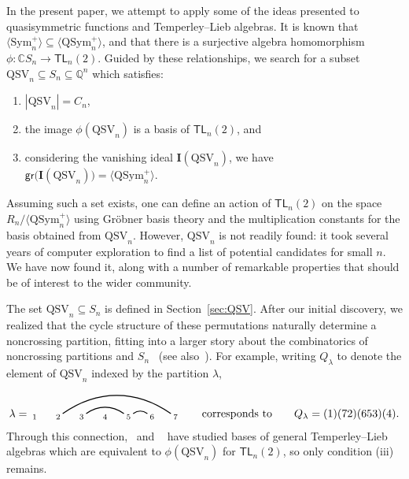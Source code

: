 \documentclass[12pt]{amsart}
\theoremstyle{definition}
\theoremstyle{remark}
\numberwithin{equation}{section}
\newcommand{\CC}{\mathbb{C}}
\newcommand{\QQ}{\mathbb{Q}}
\newcommand{\TL}{\mathsf{TL}}
\newcommand{\Sym}{\mathrm{Sym}}
\newcommand{\QSym}{\mathrm{QSym}}
\newcommand{\QSV}{\mathrm{QSV}}
\begin{document}
In the present paper, we attempt to apply some of the ideas presented to quasisymmetric functions and Temperley--Lieb algebras. 
It is known  that $\langle \Sym_{n}^{+} \rangle \subseteq \langle \QSym_{n}^{+} \rangle$, and that there is a surjective algebra homomorphism $\phi: \CC S_{n} \to \TL_{n}(2)$. 
Guided by these relationships, we search for a subset $\QSV_{n} \subseteq S_{n} \subseteq \QQ^{n}$ which satisfies:
\begin{enumerate}[itemsep = 1ex, label=(\roman*)]
\item $|\QSV_{n}| = C_{n}$,

\item the image $\phi(\QSV_{n})$ is a basis of $\TL_{n}(2)$, and

\item considering the vanishing ideal $\mathbf{I}(\QSV_{n})$, we have $\mathsf{gr}\big(\mathbf{I}(\QSV_{n})\big) = \langle \QSym_{n}^{+} \rangle$.

\end{enumerate}
Assuming such a set exists, one can define an action of $\TL_{n}(2)$ on the space $R_{n}\big/\langle \QSym_{n}^{+} \rangle$ using Gr\"{o}bner basis theory and the multiplication constants for the basis obtained from $\QSV_{n}$.  
However, $\QSV_{n}$ is not readily found: it took several years of computer exploration to find a list of potential candidates for small $n$.  
We have now found it, along with a number of remarkable properties that should be of interest to the wider community.

The set $\QSV_{n} \subseteq S_{n}$ is defined in Section~\ref{sec:QSV}.  
After our initial discovery, we realized that the cycle structure of these permutations naturally determine a noncrossing partition, fitting into a larger story about the combinatorics of noncrossing partitions and $S_{n}$~\cite{Baine} (see also~\cite{McCammond}).  
For example, writing $Q_{\lambda}$ to denote the element of $\QSV_{n}$ indexed by the partition $\lambda$,
\[
\lambda = \begin{tikzpicture}[scale = 0.75, baseline = 0.75*-0.2]
\foreach \x in {1, ..., 7}{\draw[fill] (\x - 1, 0) node[inner sep = 2pt] (\x) {$\scriptstyle \x$};}
\foreach \i\j in {5/6, 3/5,2/7}{\draw[thick] (\i) to[out = 35, in = 145] (\j);}
\end{tikzpicture}
\qquad\text{corresponds to}\qquad
Q_{\lambda} = (1)(72)(653)(4).
\]
Through this connection,~\cite{GobetWilliams} and ~\cite{Zinno} have studied bases of general Temperley--Lieb algebras which are equivalent to $\phi(\QSV_{n})$ for $\TL_{n}(2)$, so only condition (iii) remains.
\end{document}
